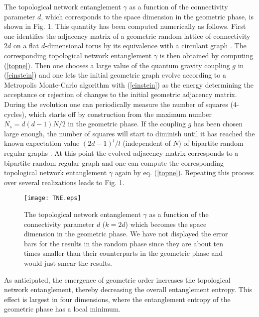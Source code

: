 \documentclass[twocolumn,
preprintnumbers,amsmath,amssymb]{revtex4}
\begin{document}
The topological network entanglement $\gamma$ as a function of the connectivity parameter $d$, which corresponds to the space dimension in the geometric phase, is shown in Fig. 1. This quantity has been computed numerically as follows. First one identifies the adjacency matrix of a geometric random lattice of connectivity $2d$ on a flat $d$-dimensional torus by its equivalence with a circulant graph \cite{circulant}. The corresponding topological network entanglement $\gamma$ is then obtained by computing (\ref{topne}). Then one chooses a large value of the quantum gravity coupling $g$ in (\ref{einstein}) and one lets the initial geometric graph evolve according to a Metropolis Monte-Carlo algorithm with (\ref{einstein}) as the energy determining the acceptance or rejection of changes to the initial geometric adjacency matrix. During the evolution one can periodically measure the number of squares (4-cycles), which starts off by construction from the maximum number $N_s = d(d-1)N/2$ in the geometric phase. If the coupling $g$ has been chosen large enough, the number of squares will start to diminish until it has reached the known expectation value $(2d-1)^l/l$ (independent of $N$) of bipartite random regular graphs \cite{wormald}. At this point the evolved adjacency matrix corresponds to a bipartite random regular graph and one can compute the corresponding topological network entanglement $\gamma$ again by eq. (\ref{topne}). Repeating this process over several realizations leads to Fig. 1. 



\begin{figure}
\texttt{[image: TNE.eps]}
\caption{\label{fig:Fig. 1} The topological network entanglement $\gamma$ as a function of the connectivity parameter $d$ ($k=2d$) which becomes the space dimension in the geometric phase. We have not displayed the error bars for the results in the random phase since they are about ten times smaller than their counterparts in the geometric phase and would just smear the results.}
\end{figure}

As anticipated, the emergence of geometric order increases the topological network entanglement, thereby decreasing the overall entanglement entropy. This effect is largest in four dimensions, where the entanglement entropy of the geometric phase has a local minimum. 
\end{document}
